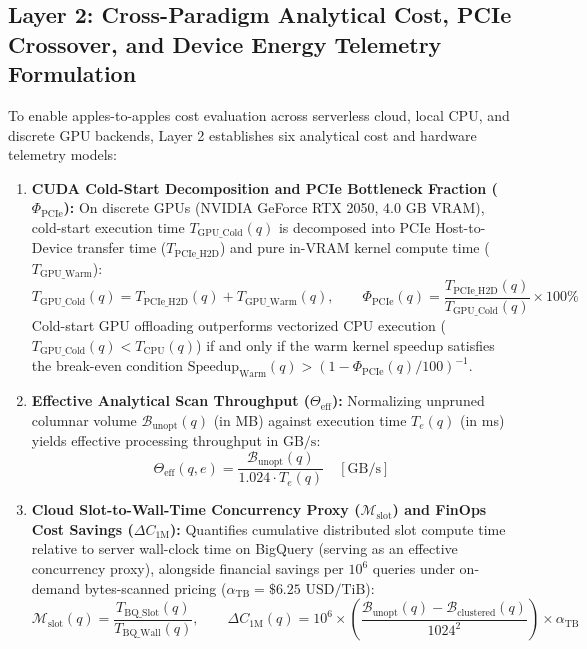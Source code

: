 \documentclass[10pt,a4paper]{article}
\begin{document}
\subsection{Layer 2: Cross-Paradigm Analytical Cost, PCIe Crossover, and Device Energy Telemetry Formulation}
To enable apples-to-apples cost evaluation across serverless cloud, local CPU, and discrete GPU backends, Layer 2 establishes six analytical cost and hardware telemetry models:
\begin{enumerate}[leftmargin=1.5em,itemsep=3pt]
    \item \textbf{CUDA Cold-Start Decomposition and PCIe Bottleneck Fraction ($\Phi_{\text{PCIe}}$):} On discrete GPUs (NVIDIA GeForce RTX 2050, $4.0\text{ GB}$ VRAM), cold-start execution time $T_{\text{GPU\_Cold}}(q)$ is decomposed into PCIe Host-to-Device transfer time ($T_{\text{PCIe\_H2D}}$) and pure in-VRAM kernel compute time ($T_{\text{GPU\_Warm}}$):
    \begin{equation}
        T_{\text{GPU\_Cold}}(q) = T_{\text{PCIe\_H2D}}(q) + T_{\text{GPU\_Warm}}(q), \qquad \Phi_{\text{PCIe}}(q) = \frac{T_{\text{PCIe\_H2D}}(q)}{T_{\text{GPU\_Cold}}(q)} \times 100\%
    \end{equation}
    Cold-start GPU offloading outperforms vectorized CPU execution ($T_{\text{GPU\_Cold}}(q) < T_{\text{CPU}}(q)$) if and only if the warm kernel speedup satisfies the break-even condition $\text{Speedup}_{\text{Warm}}(q) > (1 - \Phi_{\text{PCIe}}(q)/100)^{-1}$.
    \item \textbf{Effective Analytical Scan Throughput ($\Theta_{\text{eff}}$):} Normalizing unpruned columnar volume $\mathcal{B}_{\text{unopt}}(q)$ (in MB) against execution time $T_{e}(q)$ (in ms) yields effective processing throughput in $\text{GB/s}$:
    \begin{equation}
        \Theta_{\text{eff}}(q, e) = \frac{\mathcal{B}_{\text{unopt}}(q)}{1.024 \cdot T_{e}(q)} \quad [\text{GB/s}]
    \end{equation}
    \item \textbf{Cloud Slot-to-Wall-Time Concurrency Proxy ($\mathcal{M}_{\text{slot}}$) and FinOps Cost Savings ($\Delta C_{\text{1M}}$):} Quantifies cumulative distributed slot compute time relative to server wall-clock time on BigQuery (serving as an effective concurrency proxy), alongside financial savings per $10^6$ queries under on-demand bytes-scanned pricing ($\alpha_{\text{TB}} = \$6.25\text{ USD/TiB}$):
    \begin{equation}
        \mathcal{M}_{\text{slot}}(q) = \frac{T_{\text{BQ\_Slot}}(q)}{T_{\text{BQ\_Wall}}(q)}, \qquad \Delta C_{\text{1M}}(q) = 10^6 \times \left( \frac{\mathcal{B}_{\text{unopt}}(q) - \mathcal{B}_{\text{clustered}}(q)}{1024^2} \right) \times \alpha_{\text{TB}}

\end{equation}
\end{enumerate}
\end{document}
